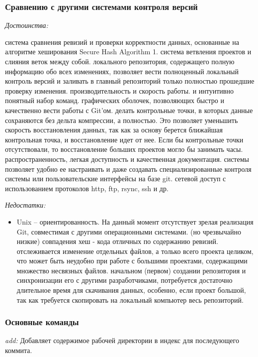 \documentclass{article}
\begin{document}
		\subsubsection{Сравнению с другими системами контроля версий}
		 	\textit{Достоинства:}
				\begin{itemize}
 система сравнения ревизий и проверки корректности данных, основанные на алгоритме хеширования Secure Hash Algorithm 1.
 система ветвления проектов и слияния веток между собой.
 локального репозитория, содержащего полную информацию обо всех изменениях, позволяет вести полноценный локальный контроль версий и заливать в главный репозиторий только полностью прошедшие проверку изменения.
 производительность и скорость работы.
 и интуитивно понятный набор команд.
 графических оболочек, позволяющих быстро и качественно вести работы с Git’ом.
 делать контрольные точки, в которых данные сохраняются без дельта компрессии, а полностью. Это позволяет уменьшить скорость восстановления данных, так как за основу берется ближайшая контрольная точка, и восстановление идет от нее. Если бы контрольные точки отсутствовали, то восстановление больших проектов могло бы занимать часы.
 распространенность, легкая доступность и качественная документация.
 системы позволяет удобно ее настраивать и даже создавать специализированные контроля системы или пользовательские интерфейсы на базе git.
 сетевой доступ с использованием протоколов http, ftp, rsync, ssh и др.
				\end{itemize}
			\textit{Недостатки:}
				\begin{itemize}
\item Unix – ориентированность. На данный момент отсутствует зрелая реализация Git, совместимая с другими операционными системами.
 (но чрезвычайно низкие) совпадения хеш - кода отличных по содержанию ревизий.
 отслеживается изменение отдельных файлов, а только всего проекта целиком, что может быть неудобно при работе с большими проектами, содержащими множество несвязных файлов.
 начальном (первом) создании репозитория и синхронизации его с другими разработчиками, потребуется достаточно длительное время для скачивания данных, особенно, если проект большой, так как требуется скопировать на локальный компьютер весь репозиторий. 
				\end{itemize}
		\subsubsection{Основные команды}
		\textit{add:} Добавляет содержимое рабочей директории в индекс для последующего коммита.\\
		
\end{document}
